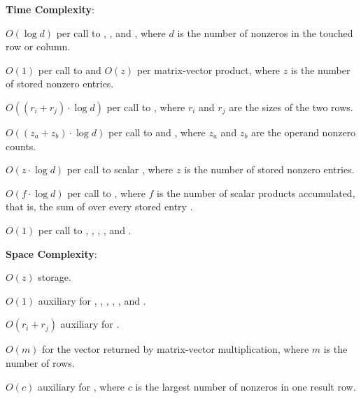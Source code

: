 \textbf{Time Complexity}:
\begin{compactitem}
  \item $O(\log d)$ per call to , , and , where $d$ is the number of nonzeros in the touched row or column.
  \item $O(1)$ per call to  and $O(z)$ per matrix-vector product, where $z$ is the number of stored nonzero entries.
  \item $O((r_i + r_j) \cdot \log d)$ per call to , where $r_i$ and $r_j$ are the sizes of the two rows.
  \item $O((z_a + z_b) \cdot \log d)$ per call to  and , where $z_a$ and $z_b$ are the operand nonzero counts.
  \item $O(z \cdot \log d)$ per call to scalar , where $z$ is the number of stored nonzero entries.
  \item $O(f \cdot \log d)$ per call to , where $f$ is the number of scalar products accumulated, that is, the sum of  over every stored entry .
  \item $O(1)$ per call to , , , , and .
\end{compactitem}

\textbf{Space Complexity}:
\begin{compactitem}
  \item $O(z)$ storage.
  \item $O(1)$ auxiliary for , , , , , and .
  \item $O(r_i + r_j)$ auxiliary for .
  \item $O(m)$ for the vector returned by matrix-vector multiplication, where $m$ is the number of rows.
  \item $O(c)$ auxiliary for , where $c$ is the largest number of nonzeros in one result row.
\end{compactitem}

